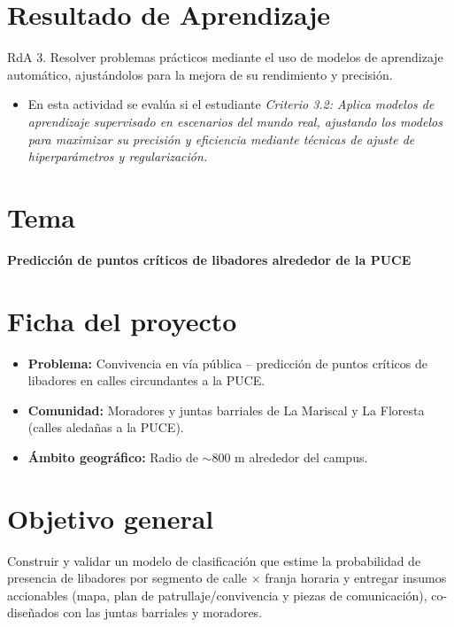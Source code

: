 \documentclass[a4,11pt]{aleph-notas}
\begin{document}
\encabezado

\section{Resultado de Aprendizaje}

RdA 3. Resolver problemas prácticos mediante el uso de modelos de aprendizaje automático, ajustándolos para la mejora de su rendimiento y precisión.

\begin{itemize}[leftmargin=*]
\item 
    En esta actividad se evalúa si el estudiante \textit{Criterio 3.2: Aplica modelos de aprendizaje supervisado en escenarios del mundo real, ajustando los modelos para maximizar su precisión y eficiencia mediante técnicas de ajuste de hiperparámetros y regularización.}
\end{itemize}


\section{Tema}

\begin{center}
    \large\bf Predicción de puntos críticos de libadores alrededor de la PUCE
\end{center}


\section{Ficha del proyecto}
\begin{itemize}
    \item \textbf{Problema:} Convivencia en vía pública -- predicción de puntos críticos de libadores en calles circundantes a la PUCE.
    \item \textbf{Comunidad:} Moradores y juntas barriales de La Mariscal y La Floresta (calles aledañas a la PUCE).
    \item \textbf{Ámbito geográfico:} Radio de \(\sim\)800 m alrededor del campus.
\end{itemize}

\section{Objetivo general}
Construir y validar un modelo de {clasificación} que estime la {probabilidad de presencia de libadores} por {segmento de calle \(\times\) franja horaria} y entregar {insumos accionables} (mapa, plan de patrullaje/convivencia y piezas de comunicación), co-diseñados con las {juntas barriales y moradores}.
\end{document}
